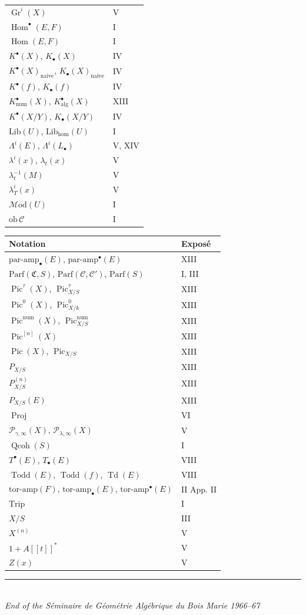 \documentclass[11pt]{article}
\theoremstyle{plain}
\theoremstyle{definition}
\theoremstyle{remark}
\DeclareMathOperator{\Proj}{Proj}
\DeclareMathOperator{\Hom}{Hom}
\DeclareMathOperator{\Pic}{Pic}
\DeclareMathOperator{\Gr}{Gr}
\providecommand{\Todd}{\operatorname{Todd}}
\providecommand{\num}{\mathrm{num}}
\providecommand{\Td}{\operatorname{Td}}
\begin{document}
\begin{longtable}{p{7.5cm}l}
$\Gr^i(X)$ & V\\
$\Hom^\bullet(E,F)$ & I\\
$\Hom(E,F)$ & I\\
$K^\bullet(X)$, $K_\bullet(X)$ & IV\\
$K^\bullet(X)_{\mathrm{naive}}$, $K_\bullet(X)_{\mathrm{naive}}$ & IV\\
$K^\bullet(f)$, $K_\bullet(f)$ & IV\\
$K^\bullet_{\mathrm{num}}(X)$, $K^\bullet_{\mathrm{alg}}(X)$ & XIII\\
$K^\bullet(X/Y)$, $K_\bullet(X/Y)$ & IV\\
$\mathrm{Lib}(U)$, $\mathrm{Lib}_{\mathrm{hom}}(U)$ & I\\
$\Lambda^i(E)$, $\Lambda^i(L_\bullet)$ & V, XIV\\
$\lambda^i(x)$, $\lambda_t(x)$ & V\\
$\lambda_t^{-1}(M)$ & V\\
$\lambda_T^i(x)$ & V\\
$\mathcal M\mathrm{od}(U)$ & I\\
$\mathrm{ob}\,\mathcal C$ & I\\
\bottomrule
\end{longtable}

\begin{longtable}{p{7.5cm}l}
\toprule
\textbf{Notation} & \textbf{Exposé}\\
\midrule
\endhead
$\mathrm{par\text{-}amp}_\bullet(E)$, $\mathrm{par\text{-}amp}^\bullet(E)$ & XIII\\
$\mathrm{Parf}(\mathfrak C,S)$, $\mathrm{Parf}(\mathcal C,\mathcal C')$, $\mathrm{Parf}(S)$ & I, III\\
$\Pic^\tau(X)$, $\Pic^\tau_{X/S}$ & XIII\\
$\Pic^0(X)$, $\Pic^0_{X/k}$ & XIII\\
$\Pic^{\num}(X)$, $\Pic^{\num}_{X/S}$ & XIII\\
$\Pic^{[n]}(X)$ & XIII\\
$\Pic(X)$, $\Pic_{X/S}$ & XIII\\
$P_{X/S}$ & XIII\\
$P_{X/S}^{(n)}$ & XIII\\
$P_{X/S}(E)$ & XIII\\
$\Proj$ & VI\\
$\mathcal P_{\gamma,\infty}(X)$, $\mathcal P_{\lambda,\infty}(X)$ & V\\
$\operatorname{Qcoh}(S)$ & I\\
$T^\bullet(E)$, $T_\bullet(E)$ & VIII\\
$\Todd(E)$, $\Todd(f)$, $\Td(E)$ & VIII\\
$\mathrm{tor\text{-}amp}(F)$, $\mathrm{tor\text{-}amp}_\bullet(E)$, $\mathrm{tor\text{-}amp}^\bullet(E)$ & II App. II\\
$\mathrm{Trip}$ & I\\
$X/S$ & III\\
$X^{(n)}$ & V\\
$1+A[[t]]^*$ & V\\
$Z(x)$ & V\\
\bottomrule
\end{longtable}

\begin{center}
\rule{0.5\textwidth}{0.4pt}\\[0.5em]
\textit{End of the Séminaire de Géométrie Algébrique du Bois Marie 1966--67}
\end{center}
\end{document}
